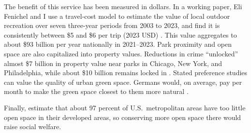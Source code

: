 \documentclass[12pt]{article}
\begin{document}
The benefit of this service has been measured in dollars. In a working paper, Eli Fenichel and I use a travel-cost model to estimate the value of local outdoor recreation over seven three-year periods from 2003 to 2023, and find it is consistently between \$5 and \$6 per trip (2023 USD) \citep{creelNationalValueLocal2026}. This value aggregates to about \$93 billion per year nationally in 2021--2023. Park proximity and open space are also capitalized into property values. Reductions in crime ``unlocked'' almost \$7 billion in property value near parks in Chicago, New York, and Philadelphia, while about \$10 billion remains locked in \citep{albouy_unlocking_2020}. Stated preference studies can value the quality of urban green space. Germans would, on average, pay  per month to make the green space closest to them more natural \citep{bronnmannValueNaturalnessUrban2023}. 

Finally, \citet{wuOpenSpaceUS2023} estimate that about 97 percent of U.S.\ metropolitan areas have too little open space in their developed areas, so conserving more open space there would raise social welfare.

\end{document}
